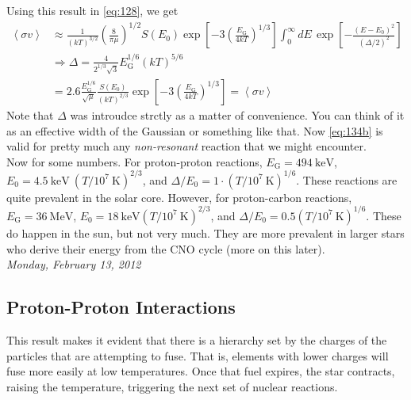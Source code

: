 \documentclass[10pt]{article}
\numberwithin{equation}{section}
\newcommand{\n}{\noindent}
\newcommand{\avg}[1]{\left\langle#1\right\rangle}
\begin{document}
  Using this result in \eqref{eq:128}, we get
  \begin{align}
    \label{eq:134}
    \avg{\sigma v} & \approx
    \frac{1}{(kT)^{3/2}}\left(\frac{8}{\pi\mu}\right)^{1/2}S(E_0)\exp\left
[-3\left(\frac{E_{\mathrm{G}}}{4kT}\right)^{1/3}\right]\int_0^\infty dE\,
    \exp\left[-\frac{(E-E_0)^2}{(\Delta/2)^2}\right]\\
    \label{eq:134a}
    & \Rightarrow \boxed{\Delta =
      \frac{4}{2^{1/3}\sqrt{3}}E_{\mathrm{G}}^{1/6}(kT)^{5/6}}\\
    \label{eq:134b}
    &=
    \boxed{2.6\frac{E_{\mathrm{G}}^{1/6}}{\sqrt{\mu}}\frac{S(E_0)}{(kT)^
{2/3}}\exp\left[-3\left(\frac{E_{\mathrm{G}}}{4kT}\right)^{1/3}\right]=\avg
{\sigma v}}
  \end{align}
  Note that $\Delta$ was introudce strctly as a matter of
  convenience. You can think of it as an effective width of the
  Gaussian or something like that. Now \eqref{eq:134b} is valid for
  pretty much any \emph{non-resonant} reaction that we might
  encounter.\\

  \n Now for some numbers. For proton-proton reactions,
  $E_{\mathrm{G}}=494\ \mathrm{keV}$, $E_0=4.5\ \mathrm{keV}\
  \left(T/10^7\ \mathrm{K}\right)^{2/3}$, and $\Delta/E_0=1\cdot
  (T/10^7\ \mathrm{K})^{1/6}$. These reactions are quite prevalent in
  the solar core. However, for proton-carbon reactions,
  $E_\mathrm{G}=36\ \mathrm{MeV}$, $E_0=18\ \mathrm{keV}(T/10^7\
  \mathrm{K})^{2/3}$, and $\Delta/E_0=0.5(T/10^7\
  \mathrm{K})^{1/6}$. These do happen in the sun, but not very
  much. They are more prevalent in larger stars who derive their
  energy from the CNO cycle (more on this later).\\
  
  \n \textit{Monday, February 13, 2012}\\

  \subsection{Proton-Proton Interactions}
  \label{sec:prot-prot-inter}

  \n This result makes it evident that there is a hierarchy set by the
  charges of the particles that are attempting to fuse. That is,
  elements with lower charges will fuse more easily at low
  temperatures. Once that fuel expires, the star contracts, raising
  the temperature, triggering the next set of nuclear reactions.\\
\end{document}
